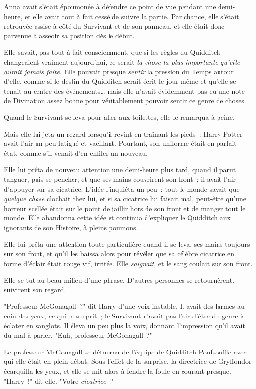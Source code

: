 Anna avait s'était époumonée à défendre ce point de vue pendant une demi-heure, et elle avait tout à fait cessé de suivre la partie. Par chance, elle s'était retrouvée assise à côté du Survivant et de son panneau, et elle était donc parvenue à asseoir sa position dès le début.

Elle savait, pas tout à fait consciemment, que si les règles du Quidditch changeaient vraiment aujourd'hui, ce serait \emph{la chose la plus importante qu'elle aurait jamais faite}. Elle pouvait presque \emph{sentir} la pression du Temps autour d'elle, comme si le destin du Quidditch serait écrit le jour même et qu'elle se tenait au centre des événements… mais elle n'avait évidemment pas eu une note de Divination assez bonne pour véritablement pouvoir sentir ce genre de choses.

Quand le Survivant se leva pour aller aux toilettes, elle le remarqua à peine.

Mais elle lui jeta un regard lorsqu'il revint en traînant les pieds~: Harry Potter avait l'air un peu fatigué et vacillant. Pourtant, son uniforme était en parfait état, comme s'il venait d'en enfiler un nouveau.

Elle lui prêta de nouveau attention une demi-heure plus tard, quand il parut tanguer, puis se pencher, et que ses mains couvrirent son front~; il avait l'air d'appuyer sur sa cicatrice. L'idée l'inquiéta un peu~: tout le monde savait que \emph{quelque chose} clochait chez lui, et si sa cicatrice lui faisait mal, peut-être qu'une horreur scellée était sur le point de jaillir hors de son front et de manger tout le monde. Elle abandonna cette idée et continua d'expliquer le Quidditch aux ignorants de son Histoire, à pleins poumons.

Elle lui prêta une attention toute particulière quand il se leva, ses mains toujours sur son front, et qu'il les baissa alors pour révéler que sa célèbre cicatrice en forme d'éclair était rouge vif, irritée. Elle \emph{saignait}, et le sang coulait sur son front.

Elle se tut au beau milieu d'une phrase. D'autres personnes se retournèrent, suivirent son regard.

"Professeur McGonagall~?" dit Harry d'une voix instable. Il avait des larmes au coin des yeux, ce qui la surprit~; le Survivant n'avait pas l'air d'être du genre à éclater en sanglots. Il éleva un peu plus la voix, donnant l'impression qu'il avait du mal à parler. "Euh, professeur McGonagall~?"

Le professeur McGonagall se détourna de l'équipe de Quidditch Poufsouffle avec qui elle était en plein débat. Sous l'effet de la surprise, la directrice de Gryffondor écarquilla les yeux, et elle se mit alors à fendre la foule en courant presque. "Harry~!" dit-elle. "Votre \emph{cicatrice}~!"

